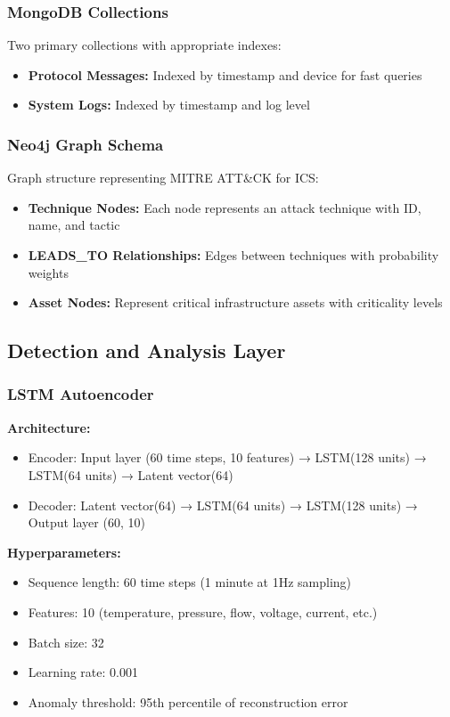 \documentclass[12pt,a4paper]{article}
\begin{document}
\subsubsection{MongoDB Collections}

Two primary collections with appropriate indexes:
\begin{itemize}[leftmargin=1cm,itemsep=0pt]
    \item \textbf{Protocol Messages:} Indexed by timestamp and device for fast queries
    \item \textbf{System Logs:} Indexed by timestamp and log level
\end{itemize}

\subsubsection{Neo4j Graph Schema}

Graph structure representing MITRE ATT\&CK for ICS:
\begin{itemize}[leftmargin=1cm,itemsep=0pt]
    \item \textbf{Technique Nodes:} Each node represents an attack technique with ID, name, and tactic
    \item \textbf{LEADS\_TO Relationships:} Edges between techniques with probability weights
    \item \textbf{Asset Nodes:} Represent critical infrastructure assets with criticality levels
\end{itemize}


\subsection{Detection and Analysis Layer}

\subsubsection{LSTM Autoencoder}

\textbf{Architecture:}
\begin{itemize}[leftmargin=1cm,itemsep=0pt]
    \item Encoder: Input layer (60 time steps, 10 features) → LSTM(128 units) → LSTM(64 units) → Latent vector(64)
    \item Decoder: Latent vector(64) → LSTM(64 units) → LSTM(128 units) → Output layer (60, 10)
\end{itemize}

\textbf{Hyperparameters:}
\begin{itemize}[leftmargin=1cm,itemsep=0pt]
    \item Sequence length: 60 time steps (1 minute at 1Hz sampling)
    \item Features: 10 (temperature, pressure, flow, voltage, current, etc.)
    \item Batch size: 32
    \item Learning rate: 0.001
    \item Anomaly threshold: 95th percentile of reconstruction error
\end{itemize}
\end{document}
